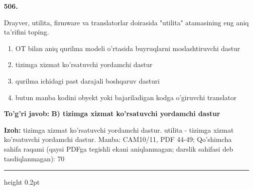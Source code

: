 \documentclass[10pt,a4paper]{article}
\begin{document}
{\bfseries\sffamily\color{ink} 506.}
\par
Drayver, utilita, firmware va translatorlar doirasida "utilita" atamasining eng aniq ta'rifini toping.
\begin{enumerate}[label=\Alph*),leftmargin=9mm]
\item OT bilan aniq qurilma modeli o'rtasida buyruqlarni moslashtiruvchi dastur
\item tizimga xizmat ko'rsatuvchi yordamchi dastur
\item qurilma ichidagi past darajali boshqaruv dasturi
\item butun manba kodini obyekt yoki bajariladigan kodga o'giruvchi translator
\end{enumerate}
\begin{tcolorbox}[enhanced,breakable,colback=teal!4,colframe=teal!60!black,boxrule=0.45pt,arc=1.2mm,left=2.7mm,right=2.7mm,top=1.8mm,bottom=1.8mm,before skip=2mm,after skip=2mm]
{\bfseries\sffamily\color{teal}To'g'ri javob:} \textbf{B) tizimga xizmat ko'rsatuvchi yordamchi dastur}
\par\smallskip
{\bfseries Izoh:} tizimga xizmat ko'rsatuvchi yordamchi dastur. utilita - tizimga xizmat ko'rsatuvchi yordamchi dastur. Manba: CAM10/11, PDF 44-49; Qo'shimcha sahifa raqami (qaysi PDFga tegishli ekani aniqlanmagan; darslik sahifasi deb tasdiqlanmagan): 70
\end{tcolorbox}
\vspace{2mm}\hrule height 0.2pt\vspace{3mm}
\end{document}
